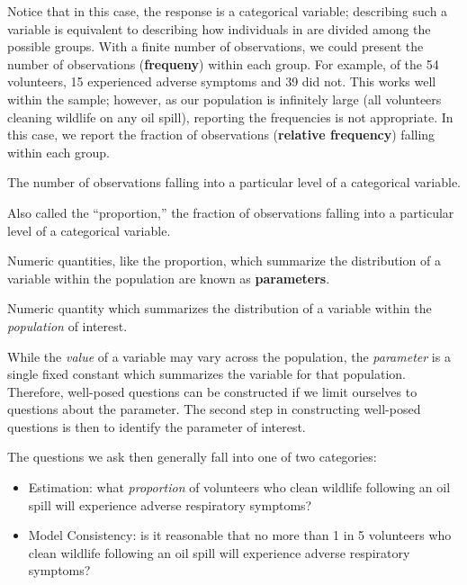 \documentclass[]{book}
\providecommand{\tightlist}{%
  \setlength{\itemsep}{0pt}\setlength{\parskip}{0pt}}
\theoremstyle{definition}
\theoremstyle{definition}
\theoremstyle{definition}
\theoremstyle{remark}
\let\BeginKnitrBlock\begin \let\EndKnitrBlock\end
\begin{document}
Notice that in this case, the response is a categorical variable;
describing such a variable is equivalent to describing how individuals
in are divided among the possible groups. With a finite number of
observations, we could present the number of observations
(\textbf{frequeny}) within each group. For example, of the 54
volunteers, 15 experienced adverse symptoms and 39 did not. This works
well within the sample; however, as our population is infinitely large
(all volunteers cleaning wildlife on any oil spill), reporting the
frequencies is not appropriate. In this case, we report the fraction of
observations (\textbf{relative frequency}) falling within each group.

\BeginKnitrBlock{definition}[Frequency]
\protect\hypertarget{def:defn-frequency}{}{\label{def:defn-frequency}
{} }The number of observations falling into a
particular level of a categorical variable.
\EndKnitrBlock{definition}

\BeginKnitrBlock{definition}[Relative Frequency]
\protect\hypertarget{def:defn-relative-frequency}{}{\label{def:defn-relative-frequency}
{} }Also called the ``proportion,'' the
fraction of observations falling into a particular level of a
categorical variable.
\EndKnitrBlock{definition}

Numeric quantities, like the proportion, which summarize the
distribution of a variable within the population are known as
\textbf{parameters}.

\BeginKnitrBlock{definition}[Parameter]
\protect\hypertarget{def:defn-parameter}{}{\label{def:defn-parameter}
{} }Numeric quantity which summarizes the
distribution of a variable within the \emph{population} of interest.
\EndKnitrBlock{definition}

While the \emph{value} of a variable may vary across the population, the
\emph{parameter} is a single fixed constant which summarizes the
variable for that population. Therefore, well-posed questions can be
constructed if we limit ourselves to questions about the parameter. The
second step in constructing well-posed questions is then to identify the
parameter of interest.

The questions we ask then generally fall into one of two categories:

\begin{itemize}
\tightlist
\item
  Estimation: what \emph{proportion} of volunteers who clean wildlife
  following an oil spill will experience adverse respiratory symptoms?
\item
  Model Consistency: is it reasonable that no more than 1 in 5
  volunteers who clean wildlife following an oil spill will experience
  adverse respiratory symptoms?
\end{itemize}
\end{document}
